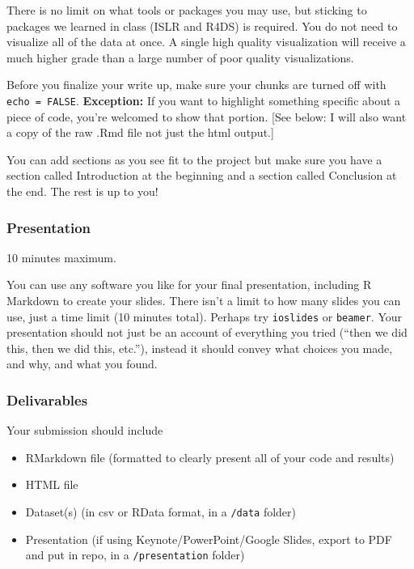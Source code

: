 \documentclass[
]{book}
\providecommand{\tightlist}{%
  \setlength{\itemsep}{0pt}\setlength{\parskip}{0pt}}
\begin{document}
There is no limit on what tools or packages you may use, but sticking to packages we learned in class (ISLR and R4DS)
is required. You do not need to visualize all of the data at once. A single high quality
visualization will receive a much higher grade than a large number of poor quality
visualizations.

Before you finalize your write up, make sure your chunks are turned off
with \texttt{echo\ =\ FALSE}. \textbf{Exception:} If you want to
highlight something specific about a piece of code, you're welcomed to show
that portion. {[}See below: I will also want a copy of the raw .Rmd file not just the html output.{]}

You can add sections as you see fit to the project but make sure
you have a section called Introduction at the beginning and a section called
Conclusion at the end. The rest is up to you!

\hypertarget{presentation}{%
\subsubsection{Presentation}\label{presentation}}

10 minutes maximum.

You can use any software you like for your final presentation, including R Markdown
to create your slides. There isn't a limit to how many slides you can use, just a
time limit (10 minutes total). Perhaps try \texttt{ioslides} or \texttt{beamer}. Your presentation
should not just be an account of everything you
tried (``then we did this, then we did this, etc.''), instead it should convey what
choices you made, and why, and what you found.

\hypertarget{delivarables}{%
\subsubsection{Delivarables}\label{delivarables}}

Your submission should include

\begin{itemize}
\tightlist
\item
  RMarkdown file (formatted to clearly present all of your code and results)
\item
  HTML file
\item
  Dataset(s) (in csv or RData format, in a \texttt{/data} folder)
\item
  Presentation (if using Keynote/PowerPoint/Google Slides, export to PDF and put in repo, in a \texttt{/presentation} folder)
\end{itemize}
\end{document}
